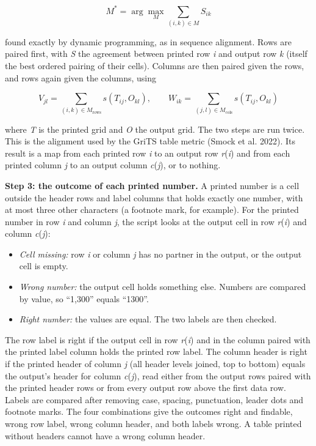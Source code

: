\begin{equation*}
M^* = \arg\max_{M} \sum_{(i,k) \in M} S_{ik}
\end{equation*}

found exactly by dynamic programming, as in sequence alignment. Rows are paired first, with \textit{S} the agreement between printed row \textit{i} and output row \textit{k} (itself the best ordered pairing of their cells). Columns are then paired given the rows, and rows again given the columns, using

\begin{equation*}
V_{jl} = \sum_{(i,k) \in M_{\mathrm{rows}}} s(T_{ij}, O_{kl}), \qquad W_{ik} = \sum_{(j,l) \in M_{\mathrm{cols}}} s(T_{ij}, O_{kl})
\end{equation*}

where \textit{T} is the printed grid and \textit{O} the output grid. The two steps are run twice. This is the alignment used by the GriTS table metric (Smock et al. 2022). Its result is a map from each printed row \textit{i} to an output row \textit{r}(\textit{i}) and from each printed column \textit{j} to an output column \textit{c}(\textit{j}), or to nothing.

\textbf{Step 3: the outcome of each printed number.} A printed number is a cell outside the header rows and label columns that holds exactly one number, with at most three other characters (a footnote mark, for example). For the printed number in row \textit{i} and column \textit{j}, the script looks at the output cell in row \textit{r}(\textit{i}) and column \textit{c}(\textit{j}):

\begin{itemize}
  \item \textit{Cell missing:} row \textit{i} or column \textit{j} has no partner in the output, or the output cell is empty.
  \item \textit{Wrong number:} the output cell holds something else. Numbers are compared by value, so ``1,300'' equals ``1300''.
  \item \textit{Right number:} the values are equal. The two labels are then checked.
\end{itemize}

The row label is right if the output cell in row \textit{r}(\textit{i}) and in the column paired with the printed label column holds the printed row label. The column header is right if the printed header of column \textit{j} (all header levels joined, top to bottom) equals the output's header for column \textit{c}(\textit{j}), read either from the output rows paired with the printed header rows or from every output row above the first data row. Labels are compared after removing case, spacing, punctuation, leader dots and footnote marks. The four combinations give the outcomes right and findable, wrong row label, wrong column header, and both labels wrong. A table printed without headers cannot have a wrong column header.

